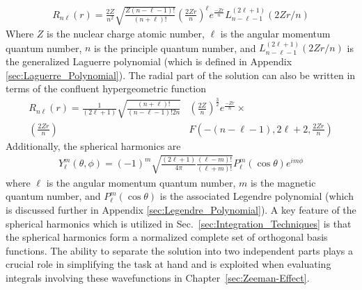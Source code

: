         \begin{align}
            R_{n\ell}(r) = \frac{2Z}{n^2} \sqrt{\frac{Z(n - \ell - 1)!}{(n + \ell)!}} \left( \frac{2Zr}{n} \right)^\ell e^{\frac{-Zr}{n}} L_{n - \ell - 1}^{(2\ell + 1)} \left( 2Zr/n \right) \label{eq:radial_equation}
        \end{align}
       \noindent Where $Z$ is the nuclear charge atomic number, $\ell$ is the angular momentum quantum number, $n$ is the principle quantum number, and $L_{n - \ell - 1}^{(2\ell + 1)} (2Zr/n)$ is the generalized Laguerre polynomial (which is defined in Appendix \ref{sec:Laguerre_Polynomial}). The radial part of the solution can also be written in terms of the confluent hypergeometric function \cite{Bethe_Salpeter_1977}
        \begin{align}
            R_{n\ell}(r) = \frac{1}{(2\ell + 1)} \sqrt{\frac{(n+\ell)!}{(n - \ell - 1)! 2n}}& \left( \frac{2Z}{n} \right)^{\frac{3}{2}} e^{\frac{-Zr}{n}} \times \\
            \left(\frac{2Zr}{n} \right) &F\left(-(n - \ell - 1), 2\ell + 2, \frac{2Zr}{n}\right) \nonumber
        \end{align}
       \noindent Additionally, the spherical harmonics are
        \begin{align}
            Y^m_\ell (\theta, \phi) = (-1)^m \sqrt{\frac{(2\ell + 1)}{4 \pi}\frac{(\ell - m)!}{(\ell + m)!}} P_\ell^m (\cos \theta) e^{i m \phi} \label{eq:angular_equation}
        \end{align}
        \noindent where $\ell$ is the angular momentum quantum number, $m$ is the magnetic quantum number, and $P_\ell^m (\cos \theta)$ is the associated Legendre polynomial (which is discussed further in Appendix \ref{sec:Legendre_Polynomial}). A key feature of the spherical harmonics which is utilized in Sec.~\ref{sec:Integration_Techniques} is that the spherical harmonics form a normalized complete set of orthogonal basis functions. The ability to separate the solution into two independent parts plays a crucial role in simplifying the task at hand and is exploited when evaluating integrals involving these wavefunctions in Chapter~\ref{sec:Zeeman-Effect}.

